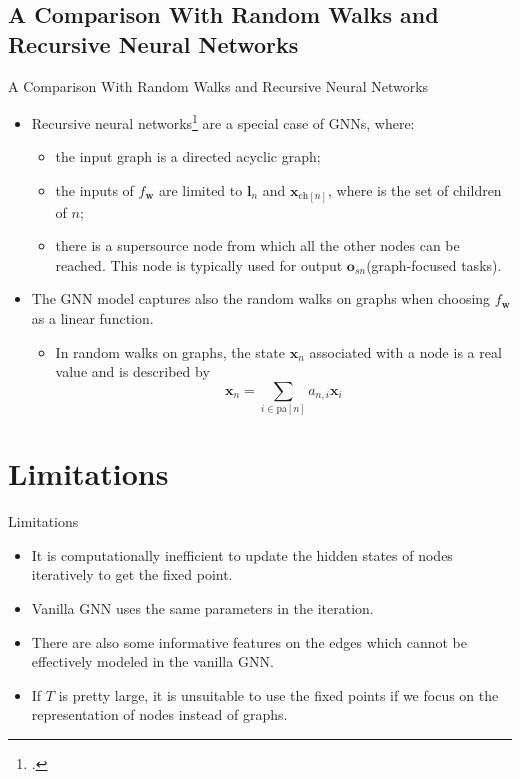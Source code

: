 \documentclass[10pt,aspectratio=169]{beamer}
\begin{document}
\subsection{A Comparison With Random Walks and Recursive Neural Networks}
\begin{frame}{A Comparison With Random Walks and Recursive Neural Networks}
    \begin{itemize}
        \item Recursive neural networks\footcite{frasconi1998general} are a special case of GNNs, where:
              \begin{itemize}
                  \item the input graph is a directed acyclic graph;
                  \item the inputs of $f_{\boldsymbol{w}}$ are limited to $\boldsymbol{l}_n$ and $\boldsymbol{x}_{\text{ch}[n]}$, where is the set of children of $n$;
                  \item there is a supersource node from which all the other nodes can be reached. This node is typically used for output $\boldsymbol{o}_{sn}$(graph-focused tasks).
              \end{itemize}\pause
        \item The GNN model captures also the random walks on graphs when choosing $f_{\boldsymbol{w}}$ as a linear function.
              \begin{itemize}
                  \item In random walks on graphs, the state $\boldsymbol{x}_n$ associated with a node is a real value and is described by
                        $$
                            \boldsymbol{x}_n = \sum_{i \in \text{pa}[n]} a_{n, i}\boldsymbol{x}_i
                        $$
              \end{itemize}
    \end{itemize}


\end{frame}

\section{Limitations}
\begin{frame}{Limitations}
    \begin{itemize}
        \item It is computationally inefficient to update the hidden states of nodes iteratively to get the fixed point.
        \item Vanilla GNN uses the same parameters in the iteration.
        \item There are also some informative features on the edges which cannot be effectively modeled in the vanilla GNN.
        \item If $T$ is pretty large, it is unsuitable to use the fixed points if we focus on the representation of nodes instead of graphs.
    \end{itemize}
\end{frame}
\end{document}
